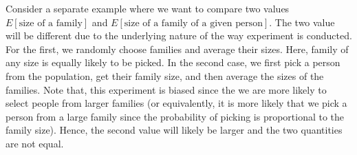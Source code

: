 \documentclass[../probability-notes.tex]{subfiles}
\begin{document}
    Consider a separate example where we want to compare two values $E[\text{size of a family}]$ and $E[\text{size of a family of a given person}]$.\newline
    The two value will be different due to the underlying nature of the way experiment is conducted. For the first, we randomly choose families and average their sizes. Here, family of any size is equally likely to be picked. In the second case, we first pick a person from the population, get their family size, and then average the sizes of the families. Note that, this experiment is biased since the we are more likely to select people from larger families (or equivalently, it is more likely that we pick a person from a large family since the probability of picking is proportional to the family size). Hence, the second value will likely be larger and the two quantities are not equal.
\end{document}
